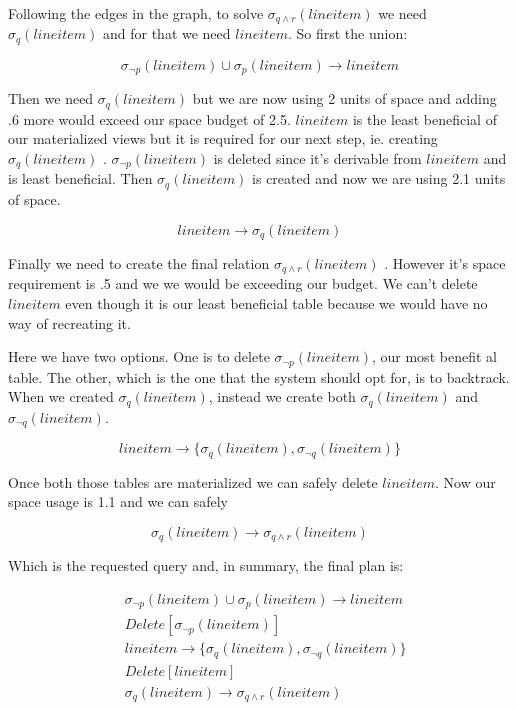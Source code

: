 Following the edges in the graph, to solve \(\sigma_{q \land
  r}(lineitem)\) we need \(\sigma_{q}(lineitem)\) and for that we need
\(lineitem\). So first the union:

\[
  \sigma_{\neg p}(lineitem) \cup \sigma_{p}(lineitem) \rightarrow lineitem
\]

Then we need \(\sigma_{q}(lineitem)\) but we are now using 2 units of
space and adding .6 more would exceed our space budget of
2.5. \(lineitem\) is the least beneficial of our materialized views
but it is required for our next step, ie. creating
\(\sigma_{q}(lineitem)\) . \(\sigma_{\neg p}(lineitem)\) is deleted
since it's derivable from \(lineitem\) and is least beneficial. Then
\(\sigma_{q}(lineitem)\) is created and now we are using 2.1 units of
space.

\[
  lineitem \rightarrow \sigma_{q}(lineitem)
\]

Finally we need to create the final relation \(\sigma_{q \land
  r}(lineitem)\) . However it's space requirement is .5 and we we would
be exceeding our budget. We can't delete \(lineitem\) even though it
is our least beneficial table because we would have no way of
recreating it.

Here we have two options. One is to delete \(\sigma_{\neg
  p}(lineitem)\), our most benefit al table. The other, which is the one
that the system should opt for, is to backtrack. When we created
\(\sigma_{q}(lineitem)\), instead we create both
\(\sigma_{q}(lineitem)\) and \(\sigma_{\neg q}(lineitem)\).

\[
  lineitem \rightarrow \{\sigma_{q}(lineitem), \sigma_{\neg q}(lineitem)\}
\]

Once both those tables are materialized we can safely delete
\(lineitem\). Now our space usage is 1.1 and we can safely

\[
  \sigma_{q}(lineitem) \rightarrow \sigma_{q \land r} (lineitem)
\]

Which is the requested query and, in summary, the final plan is:

\begin{align*}
  &\sigma_{\neg p}(lineitem) \cup \sigma_{p}(lineitem) \rightarrow lineitem \\
  &Delete[\sigma_{\neg p}(lineitem)] \\
  &lineitem \rightarrow \{\sigma_{q}(lineitem), \sigma_{\neg q}(lineitem)\} \\
  &Delete[lineitem] \\
  &\sigma_{q}(lineitem) \rightarrow \sigma_{q \land r} (lineitem)
\end{align*}

